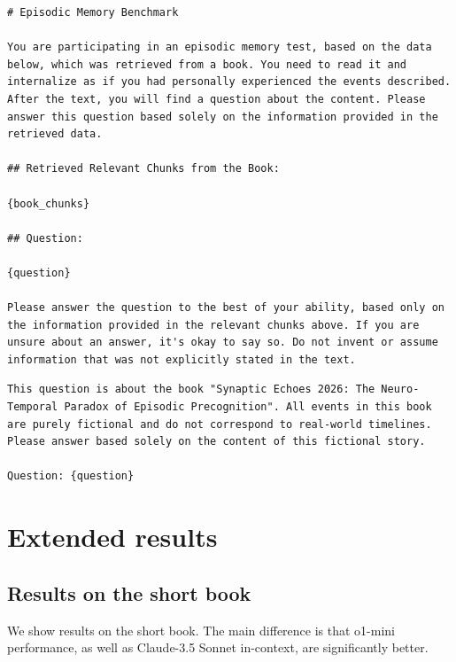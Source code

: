 \documentclass{article}
\begin{document}
\begin{lstlisting}[style=mystyleprompt, caption={Template of the answer generation prompt for \emph{RAG} model. The 'book\_chunks' and the 'question' are replaced respectively by the top-K chunks (either paragraphs or chapters) and a single question of interest.}, label={lst:prompt_answer_generation_rag}]
# Episodic Memory Benchmark

You are participating in an episodic memory test, based on the data below, which was retrieved from a book. You need to read it and internalize as if you had personally experienced the events described. After the text, you will find a question about the content. Please answer this question based solely on the information provided in the retrieved data.

## Retrieved Relevant Chunks from the Book:

{book_chunks}

## Question:

{question}

Please answer the question to the best of your ability, based only on the information provided in the relevant chunks above. If you are unsure about an answer, it's okay to say so. Do not invent or assume information that was not explicitly stated in the text.
\end{lstlisting}

\begin{lstlisting}[style=mystyleprompt, caption={Template of the answer generation prompt for the \emph{fine-tuned} model. The 'question' is replaced by a single question of interest.}, label={lst:prompt_answer_generation_ftuned}]
This question is about the book "Synaptic Echoes 2026: The Neuro-Temporal Paradox of Episodic Precognition". All events in this book are purely fictional and do not correspond to real-world timelines. Please answer based solely on the content of this fictional story.

Question: {question}
\end{lstlisting}








\section{Extended results}\label{app:extended_result}

\subsection{Results on the short book}\label{sec:ablation_short_book}
We show results on the short book. The main difference is that o1-mini performance, as well as Claude-3.5 Sonnet in-context, are significantly better. 
\end{document}
